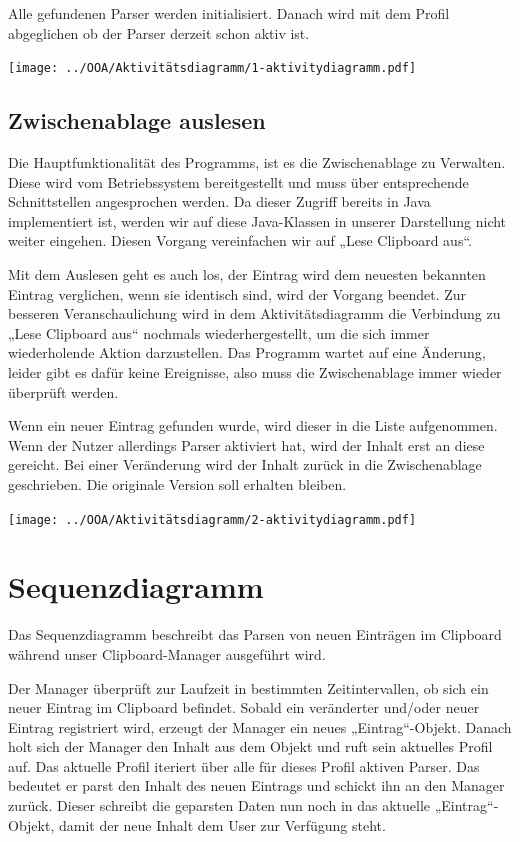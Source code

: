 \documentclass[a4paper,11pt,abstracton,titlepage]{scrartcl}
\begin{document}
Alle gefundenen Parser werden initialisiert. Danach wird mit dem Profil
abgeglichen ob der Parser derzeit schon aktiv ist.

\texttt{[image: ../OOA/Aktivitätsdiagramm/1-aktivitydiagramm.pdf]}

\subsection{Zwischenablage auslesen}
Die Hauptfunktionalität des Programms, ist es die Zwischenablage zu Verwalten.
Diese wird vom Betriebssystem bereitgestellt und muss über entsprechende
Schnittstellen angesprochen werden. Da dieser Zugriff bereits in Java
implementiert ist, werden wir auf diese Java-Klassen in unserer Darstellung
nicht weiter eingehen. Diesen Vorgang vereinfachen wir auf „Lese Clipboard aus“.

Mit dem Auslesen geht es auch los, der Eintrag wird dem neuesten bekannten
Eintrag verglichen, wenn sie identisch sind, wird der Vorgang beendet. Zur
besseren Veranschaulichung wird in dem Aktivitätsdiagramm die Verbindung zu
„Lese Clipboard aus“ nochmals wiederhergestellt, um die sich immer wiederholende
Aktion darzustellen. Das Programm wartet auf eine Änderung, leider gibt es dafür
keine Ereignisse, also muss die Zwischenablage immer wieder überprüft werden.

Wenn ein neuer Eintrag gefunden wurde, wird dieser in die Liste aufgenommen. 
Wenn der Nutzer allerdings Parser aktiviert hat, wird der Inhalt erst an diese
gereicht. Bei einer Veränderung wird der Inhalt zurück in die Zwischenablage
geschrieben. Die originale Version soll erhalten bleiben.

\texttt{[image: ../OOA/Aktivitätsdiagramm/2-aktivitydiagramm.pdf]}

\newpage

\section{Sequenzdiagramm}
Das Sequenzdiagramm beschreibt das Parsen von neuen Einträgen im Clipboard
während unser Clipboard-Manager ausgeführt wird.

Der Manager überprüft zur Laufzeit in bestimmten Zeitintervallen, ob sich ein
neuer Eintrag im Clipboard befindet. Sobald ein veränderter und/oder neuer
Eintrag registriert wird, erzeugt der Manager ein neues „Eintrag“-Objekt. Danach
holt sich der Manager den Inhalt aus dem Objekt und ruft sein aktuelles Profil
auf. Das aktuelle Profil iteriert über alle für dieses Profil aktiven Parser.
Das bedeutet er parst den Inhalt des neuen Eintrags und schickt ihn an den
Manager zurück. Dieser schreibt die geparsten Daten nun noch in das aktuelle
„Eintrag“-Objekt, damit der neue Inhalt dem User zur Verfügung steht.
\end{document}
